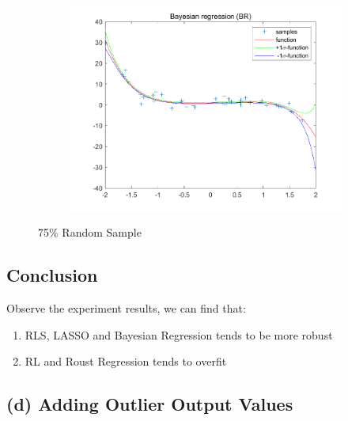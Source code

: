 \documentclass{article}
\begin{document}
\begin{figure}[H]
\begin{subfigure}[b]{0.475\textwidth}
        \includegraphics[width=\textwidth]{fig/1c-75-br.png} 
    \end{subfigure}
    \caption{75\% Random Sample}
\end{figure}

\subsection*{Conclusion}
Observe the experiment results, we can find that:

\begin{enumerate}[label=(\roman*)]
    \item RLS, LASSO and Bayesian Regression tends to be more robust
    \item RL and Roust Regression tends to overfit 
\end{enumerate}

\subsection*{(d) Adding Outlier Output Values}
\end{document}
